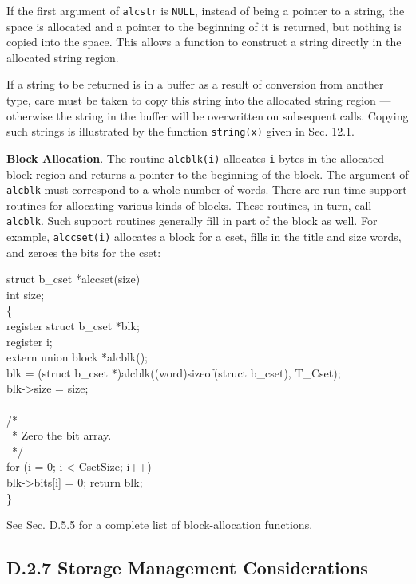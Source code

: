 If the first argument of \texttt{alcstr} is \texttt{NULL}, instead of being
a pointer to a string, the space is allocated and a pointer to the
beginning of it is returned, but nothing is copied into the space. This
allows a function to construct a string directly in the allocated string
region.

If a string to be returned is in a buffer as a result of conversion
from another type, care must be taken to copy this string into the
allocated string region --- otherwise the string in the buffer will
be overwritten on subsequent calls. Copying such strings is
illustrated by the function \texttt{string(x)} given in Sec. 12.1.

\textbf{Block Allocation}. The routine \texttt{alcblk(i)} allocates
\texttt{i} bytes in the allocated block region and returns a pointer to the
beginning of the block. The argument of \texttt{alcblk} must correspond to
a whole number of words. There are run-time support routines for allocating
various kinds of blocks. These routines, in turn, call \texttt{alcblk}.
Such support routines generally fill in part of the block as well. For
example, \texttt{alccset(i)} allocates a block for a cset, fills in the
title and size words, and zeroes the bits for the cset:
\goodbreak
\begin{iconcode}
struct b\_cset *alccset(size)\\
int size;\\
\{\\
\>register struct b\_cset *blk;\\
\>register i;\\
\>extern union block *alcblk();\\
\>blk = (struct b\_cset *)alcblk((word)sizeof(struct b\_cset), T\_Cset);\\
\>blk->size = size;\\
\\
\>/*\\
\>\ * Zero the bit array.\\
\>\ */\\
\>for (i = 0; i < CsetSize; i++)\\
\>\>blk->bits[i] = 0; return blk;\\
\}
\end{iconcode}

\noindent
See Sec. D.5.5 for a complete list of block-allocation functions.

\subsection[D.2.7 Storage Management Considerations]%
           {D.2.7 Storage Management Considerations}

